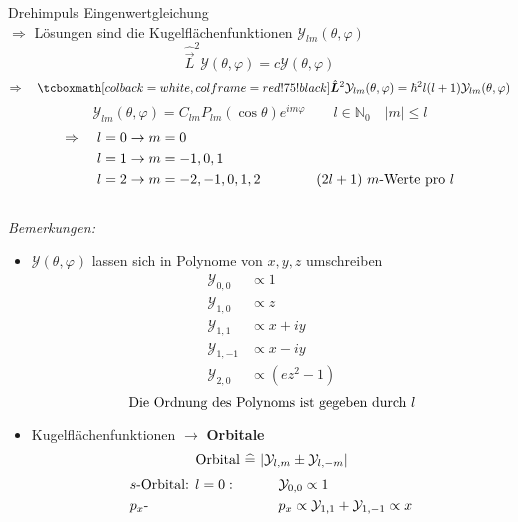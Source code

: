 \begin{enumerate}[(1)]
	Drehimpuls Eingenwertgleichung\\
	$ \Rightarrow $ Lösungen sind die Kugelflächenfunktionen $ \mathcal{Y}_{lm}(\theta,\varphi) $
	\begin{equation*}
	\hat{\vec{L}}^2 \mathcal{Y}(\theta,\varphi) = c \mathcal{Y} (\theta,\varphi)
	\end{equation*}
	\begin{equation*}
	\Rightarrow \quad \rmbox{\hat{\vec{L}}^2 \mathcal{Y}_{lm}(\theta,\varphi) = \hbar^2 l(l+1) \mathcal{Y}_{lm}(\theta,\varphi)}
	\end{equation*}
	\begin{equation*}
	\mathcal{Y}_{lm}(\theta,\varphi) = C_{lm} P_{lm} (\cos \theta) e^{i m \varphi} \qquad l \in \mathbb{N}_0 \quad |m| \le l
	\end{equation*}
	\begin{align*}
	\Rightarrow \quad l = 0 & \to m = 0\\
	l = 1 & \to m = -1, 0, 1\\
	l=2 & \to m = -2, -1, 0, 1, 2 \qquad \qquad (2l + 1) \ m \textrm{-Werte pro } l
	\end{align*}
	\\[5pt]
	\emph{Bemerkungen:}
	\begin{itemize}
		\item $ \mathcal{Y}(\theta,\varphi) $ lassen sich in Polynome von $ x, y, z $ umschreiben
		\begin{align*}
		\mathcal{Y}_{0,0} &\propto 1\\
		\mathcal{Y}_{1,0} &\propto z\\
		\mathcal{Y}_{1,1} &\propto x + i y\\
		\mathcal{Y}_{1,-1} &\propto x - i y\\
		\mathcal{Y}_{2,0} &\propto (ez^2 - 1)
		\end{align*}
		\begin{equation*}
		\textrm{Die Ordnung des Polynoms ist gegeben durch } l
		\end{equation*}
		\item Kugelflächenfunktionen $ \rightarrow $ \textbf{Orbitale}
		\begin{equation*}
		\textrm{Orbital } \widehat{=} \ |\mathcal{Y}_{l,m} \pm \mathcal{Y}_{l,-m}|
		\end{equation*}
		\begin{align*}
		&s \tx{-Orbital: } l = 0 : \qquad \quad \mathcal{Y}_{0,0} \propto 1\\
		&p_x \tx{- } \qquad \qquad \qquad \qquad \quad p_x \propto \mathcal{Y}_{1,1} + \mathcal{Y}_{1,-1} \propto x\\

\end{align*}
\end{itemize}
\end{enumerate}
